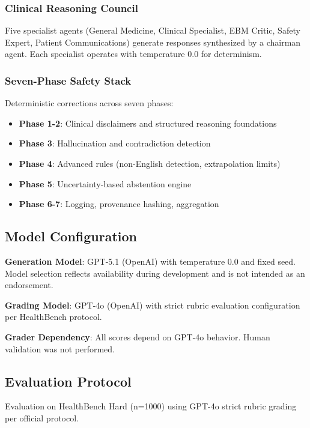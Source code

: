 \documentclass[10pt,twocolumn]{article}
\begin{document}
\subsubsection{Clinical Reasoning Council}

Five specialist agents (General Medicine, Clinical Specialist, EBM Critic, Safety Expert, Patient Communications) generate responses synthesized by a chairman agent. Each specialist operates with temperature 0.0 for determinism.

\subsubsection{Seven-Phase Safety Stack}

Deterministic corrections across seven phases:
\begin{itemize}
  \item \textbf{Phase 1-2}: Clinical disclaimers and structured reasoning foundations
  \item \textbf{Phase 3}: Hallucination and contradiction detection
  \item \textbf{Phase 4}: Advanced rules (non-English detection, extrapolation limits)
  \item \textbf{Phase 5}: Uncertainty-based abstention engine
  \item \textbf{Phase 6-7}: Logging, provenance hashing, aggregation
\end{itemize}

\subsection{Model Configuration}

\textbf{Generation Model}: GPT-5.1 (OpenAI) with temperature 0.0 and fixed seed. Model selection reflects availability during development and is not intended as an endorsement.

\textbf{Grading Model}: GPT-4o (OpenAI) with strict rubric evaluation configuration per HealthBench protocol.

\textbf{Grader Dependency}: All scores depend on GPT-4o behavior. Human validation was not performed.

\subsection{Evaluation Protocol}

Evaluation on HealthBench Hard (n=1000) using GPT-4o strict rubric grading per official protocol.
\end{document}
